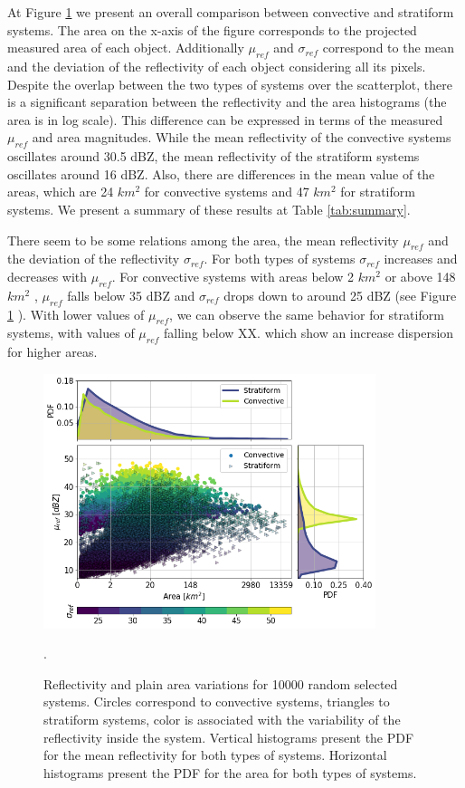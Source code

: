 \documentclass[preprint,12pt]{elsarticle}
\begin{document}
At Figure \ref{fig:ConvectiveAreaVsRef} we present an overall comparison between convective and stratiform systems.   The area on the x-axis of the figure corresponds to the projected measured area of each object.  Additionally $\mu_{ref}$ and $\sigma_{ref}$ correspond to the mean and the deviation of the reflectivity of each object considering all its pixels.  Despite the overlap between the two types of systems over the scatterplot, there is a significant separation between the reflectivity and the area histograms (the area is in log scale). This difference can be expressed in terms of the measured $\mu_{ref}$ and area magnitudes. While the mean reflectivity of the convective systems oscillates around 30.5 dBZ, the mean reflectivity of the stratiform systems oscillates around 16 dBZ.   Also, there are differences in the mean value of the areas, which are 24 $km^2$ for convective systems and 47 $km^2$ for stratiform systems.  We present a summary of these results at Table \ref{tab:summary}.

There seem to be some relations among the area, the mean reflectivity $\mu_{ref}$ and the deviation of the reflectivity $\sigma_{ref}$.  For  both types of systems $\sigma_{ref}$  increases and decreases with $\mu_{ref}$. For convective systems with areas below 2 $km^2$ or above 148$km^2$ , $\mu_{ref}$ falls below 35 dBZ and $\sigma_{ref}$ drops down to around 25 dBZ (see Figure \ref{fig:ConvectiveAreaVsRef} ).  With lower values of $\mu_{ref}$, we can observe the same behavior for stratiform systems, with values of $\mu_{ref}$ falling below XX. which show an increase dispersion for higher areas.   

\begin{figure}[!h]
\centering
    \includegraphics[width=9.7cm]{Figuras/Area_vs_Ref_histos.png}
    \caption{Reflectivity and plain area variations for 10000 random selected systems.  Circles correspond to convective systems, triangles to stratiform systems, color is associated with the variability of the reflectivity inside the system.  Vertical histograms present the PDF for the mean reflectivity for both types of systems.  Horizontal histograms present the PDF for the area for both types of systems.}.
    \label{fig:ConvectiveAreaVsRef}
\end{figure}
\end{document}
